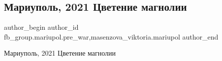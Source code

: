  
 
 
 
 

\subsection{Мариуполь, 2021  Цветение магнолии}
\label{sec:05_02_2023.fb.fb_group.mariupol.pre_war.3.mariupol__2021__tsve}
 
\ifcmt
 author_begin
   author_id fb_group.mariupol.pre_war,masenzova_viktoria.mariupol
 author_end
\fi

Мариуполь, 2021 Цветение магнолии 🌸

